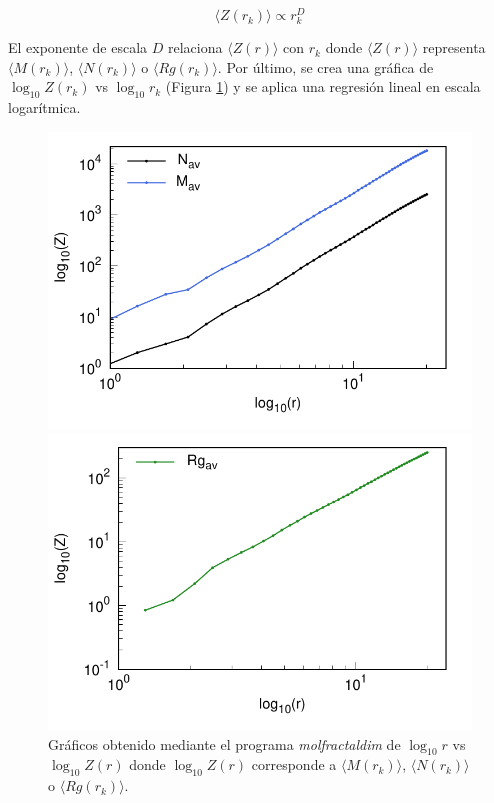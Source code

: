  	\begin{equation}
 		\langle Z(r_{k}) \rangle \propto r^{D}_{k}
 		\label{eq:leyp2}
 	\end{equation}
 	
 	El exponente de escala $D$ relaciona $\langle Z(r) \rangle$ 
 	con $r_{k}$ donde $\langle Z(r) \rangle$ representa $\langle M(r_k) \rangle$,
 	 $\langle N(r_k) \rangle$ o $\langle Rg(r_k) \rangle$. 
 	Por último, se crea una gr\'{a}fica de $\log_{10}Z(r_k)$ vs $\log_{10}r_{k}$ 
 	(Figura \ref{fig:GrafD}) y se aplica una 
 	regresi\'{o}n lineal en escala logar\'{i}tmica.
 	
	\begin{figure}[H]
		\hspace{-0.3cm} 
		\begin{minipage}{0.49\textwidth}
			\centering
			\includegraphics[width=\linewidth]{graphs/molmass/Zvsr.pdf}
		\end{minipage}
		\hspace{0.2cm}
		\begin{minipage}{0.49\textwidth}
			\centering
			\includegraphics[width=\linewidth]{graphs/molmass/Zvsr-Rg.pdf}
		\end{minipage}
		
		\caption{
			Gr\'{a}ficos obtenido mediante el programa \textit{molfractaldim} de $\log_{10}r$ vs $\log_{10}Z(r)$ donde $\log_{10}Z(r)$ 
			corresponde a $\langle M(r_k) \rangle$, $\langle N(r_k) \rangle$ 
			o $\langle Rg(r_k) \rangle$. }
		\label{fig:GrafD}
	\end{figure}


